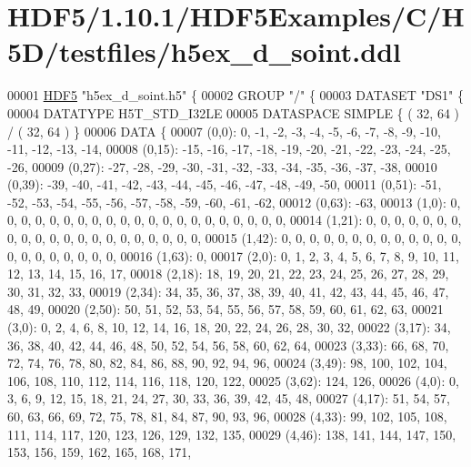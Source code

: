 \hypertarget{_h_d_f5_21_810_81_2_h_d_f5_examples_2_c_2_h5_d_2testfiles_2h5ex__d__soint_8ddl_source}{}\section{H\+D\+F5/1.10.1/\+H\+D\+F5\+Examples/\+C/\+H5\+D/testfiles/h5ex\+\_\+d\+\_\+soint.ddl}
\label{_h_d_f5_21_810_81_2_h_d_f5_examples_2_c_2_h5_d_2testfiles_2h5ex__d__soint_8ddl_source}

\begin{DoxyCode}
00001 \hyperlink{namespace_h_d_f5}{HDF5} \textcolor{stringliteral}{"h5ex\_d\_soint.h5"} \{
00002 GROUP \textcolor{stringliteral}{"/"} \{
00003    DATASET \textcolor{stringliteral}{"DS1"} \{
00004       DATATYPE  H5T\_STD\_I32LE
00005       DATASPACE  SIMPLE \{ ( 32, 64 ) / ( 32, 64 ) \}
00006       DATA \{
00007       (0,0): 0, -1, -2, -3, -4, -5, -6, -7, -8, -9, -10, -11, -12, -13, -14,
00008       (0,15): -15, -16, -17, -18, -19, -20, -21, -22, -23, -24, -25, -26,
00009       (0,27): -27, -28, -29, -30, -31, -32, -33, -34, -35, -36, -37, -38,
00010       (0,39): -39, -40, -41, -42, -43, -44, -45, -46, -47, -48, -49, -50,
00011       (0,51): -51, -52, -53, -54, -55, -56, -57, -58, -59, -60, -61, -62,
00012       (0,63): -63,
00013       (1,0): 0, 0, 0, 0, 0, 0, 0, 0, 0, 0, 0, 0, 0, 0, 0, 0, 0, 0, 0, 0, 0,
00014       (1,21): 0, 0, 0, 0, 0, 0, 0, 0, 0, 0, 0, 0, 0, 0, 0, 0, 0, 0, 0, 0, 0,
00015       (1,42): 0, 0, 0, 0, 0, 0, 0, 0, 0, 0, 0, 0, 0, 0, 0, 0, 0, 0, 0, 0, 0,
00016       (1,63): 0,
00017       (2,0): 0, 1, 2, 3, 4, 5, 6, 7, 8, 9, 10, 11, 12, 13, 14, 15, 16, 17,
00018       (2,18): 18, 19, 20, 21, 22, 23, 24, 25, 26, 27, 28, 29, 30, 31, 32, 33,
00019       (2,34): 34, 35, 36, 37, 38, 39, 40, 41, 42, 43, 44, 45, 46, 47, 48, 49,
00020       (2,50): 50, 51, 52, 53, 54, 55, 56, 57, 58, 59, 60, 61, 62, 63,
00021       (3,0): 0, 2, 4, 6, 8, 10, 12, 14, 16, 18, 20, 22, 24, 26, 28, 30, 32,
00022       (3,17): 34, 36, 38, 40, 42, 44, 46, 48, 50, 52, 54, 56, 58, 60, 62, 64,
00023       (3,33): 66, 68, 70, 72, 74, 76, 78, 80, 82, 84, 86, 88, 90, 92, 94, 96,
00024       (3,49): 98, 100, 102, 104, 106, 108, 110, 112, 114, 116, 118, 120, 122,
00025       (3,62): 124, 126,
00026       (4,0): 0, 3, 6, 9, 12, 15, 18, 21, 24, 27, 30, 33, 36, 39, 42, 45, 48,
00027       (4,17): 51, 54, 57, 60, 63, 66, 69, 72, 75, 78, 81, 84, 87, 90, 93, 96,
00028       (4,33): 99, 102, 105, 108, 111, 114, 117, 120, 123, 126, 129, 132, 135,
00029       (4,46): 138, 141, 144, 147, 150, 153, 156, 159, 162, 165, 168, 171,

\end{DoxyCode}
